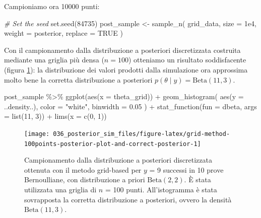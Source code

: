 \documentclass[
  10pt,
  italian,
  a4paper,
  extrafontsizes,onecolumn,openright
  ]{memoir}
\newenvironment{Shaded}{\begin{snugshade}}{\end{snugshade}}
\newcommand{\AttributeTok}[1]{\textcolor[rgb]{0.77,0.63,0.00}{#1}}
\newcommand{\CommentTok}[1]{\textcolor[rgb]{0.56,0.35,0.01}{\textit{#1}}}
\newcommand{\ConstantTok}[1]{\textcolor[rgb]{0.00,0.00,0.00}{#1}}
\newcommand{\DecValTok}[1]{\textcolor[rgb]{0.00,0.00,0.81}{#1}}
\newcommand{\FloatTok}[1]{\textcolor[rgb]{0.00,0.00,0.81}{#1}}
\newcommand{\FunctionTok}[1]{\textcolor[rgb]{0.00,0.00,0.00}{#1}}
\newcommand{\NormalTok}[1]{#1}
\newcommand{\OtherTok}[1]{\textcolor[rgb]{0.56,0.35,0.01}{#1}}
\newcommand{\SpecialCharTok}[1]{\textcolor[rgb]{0.00,0.00,0.00}{#1}}
\newcommand{\StringTok}[1]{\textcolor[rgb]{0.31,0.60,0.02}{#1}}
\begin{document}
\noindent
Campioniamo ora 10000 punti:

\begin{Shaded}
\begin{Highlighting}[]
\CommentTok{\# Set the seed}
\FunctionTok{set.seed}\NormalTok{(}\DecValTok{84735}\NormalTok{)}
\NormalTok{post\_sample }\OtherTok{\textless{}{-}} \FunctionTok{sample\_n}\NormalTok{(}
\NormalTok{  grid\_data,}
  \AttributeTok{size =} \FloatTok{1e4}\NormalTok{,}
  \AttributeTok{weight =}\NormalTok{ posterior,}
  \AttributeTok{replace =} \ConstantTok{TRUE}
\NormalTok{)}
\end{Highlighting}
\end{Shaded}

\noindent
Con il campionamento dalla distribuzione a posteriori discretizzata costruita mediante una griglia più densa (\(n = 100\)) otteniamo un risultato soddisfacente (figura \ref{fig:grid-method-100points-posterior-plot-and-correct-posterior}): la distribuzione dei valori prodotti dalla simulazione ora approssima molto bene la corretta distribuzione a posteriori \(p(\theta \mid y) = \mbox{Beta}(11, 3)\).

\begin{Shaded}
\begin{Highlighting}[]
\NormalTok{post\_sample }\SpecialCharTok{\%\textgreater{}\%}
  \FunctionTok{ggplot}\NormalTok{(}\FunctionTok{aes}\NormalTok{(}\AttributeTok{x =}\NormalTok{ theta\_grid)) }\SpecialCharTok{+}
  \FunctionTok{geom\_histogram}\NormalTok{(}
    \FunctionTok{aes}\NormalTok{(}\AttributeTok{y =}\NormalTok{ ..density..), }
    \AttributeTok{color =} \StringTok{"white"}\NormalTok{, }
    \AttributeTok{binwidth =} \FloatTok{0.05}
\NormalTok{  ) }\SpecialCharTok{+}
  \FunctionTok{stat\_function}\NormalTok{(}\AttributeTok{fun =}\NormalTok{ dbeta, }\AttributeTok{args =} \FunctionTok{list}\NormalTok{(}\DecValTok{11}\NormalTok{, }\DecValTok{3}\NormalTok{)) }\SpecialCharTok{+}
  \FunctionTok{lims}\NormalTok{(}\AttributeTok{x =} \FunctionTok{c}\NormalTok{(}\DecValTok{0}\NormalTok{, }\DecValTok{1}\NormalTok{))}
\end{Highlighting}
\end{Shaded}

\begin{figure}[h]

{\centering \texttt{[image: 036\_posterior\_sim\_files/figure-latex/grid-method-100points-posterior-plot-and-correct-posterior-1]} 

}

\caption{Campionamento dalla  distribuzione a posteriori discretizzata ottenuta con il metodo grid-based per $y$ = 9 successi in 10 prove Bernoulliane, con distribuzione a priori $\mbox{Beta}(2, 2)$. È stata utilizzata una griglia di $n$ = 100 punti. All'istogramma è stata sovrapposta la corretta distribuzione a posteriori, ovvero la densità $\mbox{Beta}(11, 3)$.}\label{fig:grid-method-100points-posterior-plot-and-correct-posterior}
\end{figure}
\end{document}
